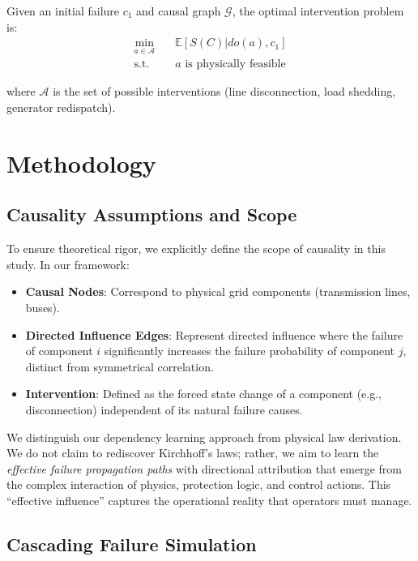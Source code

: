 \documentclass[journal,12pt,onecolumn]{IEEEtran}
\begin{document}
Given an initial failure $c_1$ and causal graph $\mathcal{G}$, the optimal intervention problem is:
\begin{align}
\min_{a \in \mathcal{A}} \quad & \mathbb{E}[S(C) | do(a), c_1] \label{eq:intervention_obj}\\
\text{s.t.} \quad & a \text{ is physically feasible}
\end{align}

where $\mathcal{A}$ is the set of possible interventions (line disconnection, load shedding, generator redispatch).

\section{Methodology}
\label{sec:methodology}

\subsection{Causality Assumptions and Scope}

To ensure theoretical rigor, we explicitly define the scope of causality in this study. In our framework:
\begin{itemize}
    \item \textbf{Causal Nodes}: Correspond to physical grid components (transmission lines, buses).
    \item \textbf{Directed Influence Edges}: Represent directed influence where the failure of component $i$ significantly increases the failure probability of component $j$, distinct from symmetrical correlation.
    \item \textbf{Intervention}: Defined as the forced state change of a component (e.g., disconnection) independent of its natural failure causes.
\end{itemize}

We distinguish our dependency learning approach from physical law derivation. We do not claim to rediscover Kirchhoff's laws; rather, we aim to learn the \textit{effective failure propagation paths} with directional attribution that emerge from the complex interaction of physics, protection logic, and control actions. This ``effective influence'' captures the operational reality that operators must manage.

\subsection{Cascading Failure Simulation}
\end{document}
